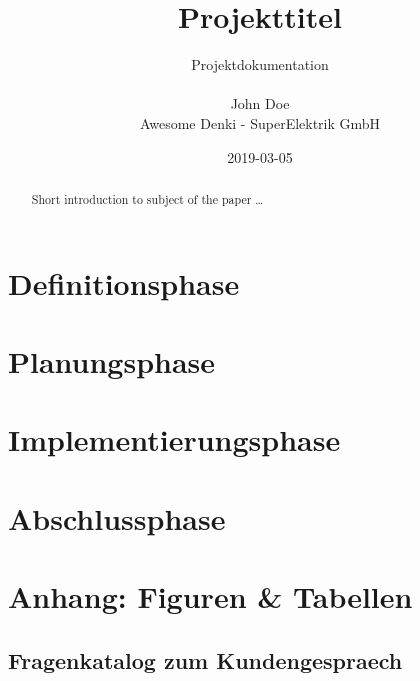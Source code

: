 \documentclass[11pt, a4paper]{article}
\title{Projekttitel}
\date{2019-03-05}
\author{Projektdokumentation\\
       \\
       John Doe\\
       Awesome Denki - SuperElektrik GmbH\\
}
\begin{document}
  \maketitle
  \newpage

  \tableofcontents
  \newpage

  \begin{abstract}
  Short introduction to subject of the paper \ldots
  \end{abstract}
  \section{Definitionsphase}
    
    \newpage

  \section{Planungsphase}
    
    \newpage

  \section{Implementierungsphase}
    
    \newpage

  \section{Abschlussphase}
    
    \newpage

    \begin{appendix}
      \listoffigures
      \listoftables
    \end{appendix}
    \newpage

  \section{Anhang: Figuren \& Tabellen}
    \subsection{Fragenkatalog zum Kundengespraech}
      
      \newpage
\end{document}
